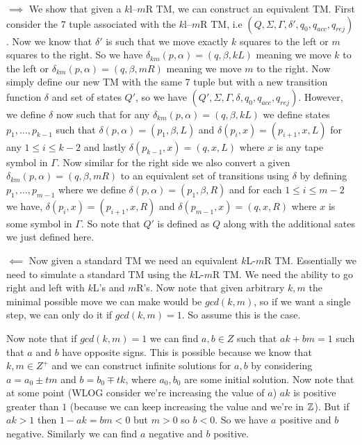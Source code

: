 \documentclass[11pt]{article}
\begin{document}
\begin{enumerate}
\begin{answer}
    $\implies$ We show that given a $k$l--$m$R TM, we can construct an equivalent TM. First consider the 7 tuple associated with the $k$l--$m$R TM, i.e $(Q, \Sigma, \Gamma, \delta', q_{0}, q_{acc}, q_{rej})$. Now we know that $\delta'$ is such that we move exactly $k$ squares to the left or $m$ squares to the right. So we have $\delta_{km}(p, \alpha) = (q, \beta, kL)$ meaning we move $k$ to the left or $\delta_{km}(p, \alpha) = (q, \beta, mR)$ meaning we move $m$ to the right. Now simply define our new TM with the same 7 tuple but with a new transition function $\delta$ and set of states $Q'$, so we have $(Q', \Sigma, \Gamma, \delta, q_{0}, q_{acc}, q_{rej})$. However, we define $\delta$ now such that for any $\delta_{km}(p, \alpha) = (q, \beta, kL)$ we define states $p_{1}, \dots, p_{k - 1}$ such that $\delta(p, \alpha) = (p_{1}, \beta, L)$ and $\delta(p_i, x) = (p_{i + 1}, x, L)$ for any $1 \le i \le k - 2$ and lastly $\delta(p_{k - 1}, x) = (q, x, L)$ where $x$ is any tape symbol in $\Gamma$. Now similar for the right side we also convert a given $\delta_{km}(p, \alpha) = (q, \beta, mR)$ to an equivalent set of transitions using $\delta$ by defining $p_{1}, \dots, p_{m - 1}$ where we define $\delta(p, \alpha) = (p_{1}, \beta, R)$ and for each $1 \le i \le m - 2$ we have, $\delta(p_{i}, x) = (p_{i + 1}, x, R)$ and $\delta(p_{m - 1}, x) = (q, x, R)$ where $x$ is some symbol in $\Gamma.$ So note that $Q'$ is defined as $Q$ along with the additional sates we just defined here.

    \vspace{1em}
    
    $\impliedby$ Now given a standard TM we need an equivalent $k$L-$m$R TM. Essentially we need to simulate a standard TM using the $k$L-$m$R TM. We need the ability to go right and left with $k$L's and $m$R's. Now note that given arbitrary $k, m$ the minimal possible move we can make would be $gcd(k, m)$, so if we want a single step, we can only do it if $gcd(k, m) = 1$.  So assume this is the case.

    \vspace{1em}
    
    Now note that if $gcd(k, m) = 1$ we can find $a, b \in Z$ such that $ak + bm = 1$ such that $a$ and $b$ have opposite signs. This is possible because we know that $k, m \in Z^{+}$ and we can construct infinite solutions for $a,b$ by considering $a = a_{0} \pm  t m$ and $b = b_{0} \mp tk$, where $a_{0}, b_{0}$ are some initial solution. Now note that at some point (WLOG consider we're increasing the value of $a$) $ak$ is positive greater than $1$ (because we can keep increasing the value and we're in $\mathbb{Z}$). But if $ak > 1$ then $1 - ak = bm < 0$ but $m > 0$ so $b < 0$. So we have $a$ positive and $b$ negative. Similarly we can find $a$ negative and $b$ positive.


\end{answer}
\end{enumerate}
\end{document}
